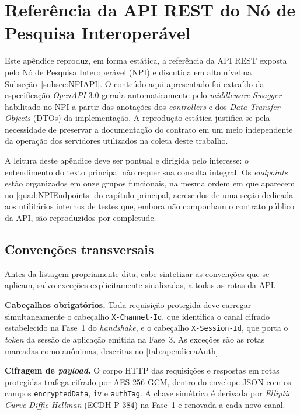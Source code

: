 \chapter{Referência da API REST do Nó de Pesquisa Interoperável}\label{cap:apendiceRefApi}

Este apêndice reproduz, em forma estática, a referência da API REST exposta pelo Nó de Pesquisa Interoperável (NPI) e discutida em alto nível na Subseção~\ref{subsec:NPIAPI}. O conteúdo aqui apresentado foi extraído da especificação \textit{OpenAPI} 3.0 gerada automaticamente pelo \textit{middleware} \textit{Swagger} habilitado no NPI a partir das anotações dos \textit{controllers} e dos \textit{Data Transfer Objects} (DTOs) da implementação. A reprodução estática justifica-se pela necessidade de preservar a documentação do contrato em um meio independente da operação dos servidores utilizados na coleta deste trabalho.

A leitura deste apêndice deve ser pontual e dirigida pelo interesse: o entendimento do texto principal não requer sua consulta integral. Os \textit{endpoints} estão organizados em onze grupos funcionais, na mesma ordem em que aparecem no \autoref{quad:NPIEndpoints} do capítulo principal, acrescidos de uma seção dedicada aos utilitários internos de testes que, embora não componham o contrato público da API, são reproduzidos por completude.

\section{Convenções transversais}\label{sec:apendiceaConvencoes}

Antes da listagem propriamente dita, cabe sintetizar as convenções que se aplicam, salvo exceções explicitamente sinalizadas, a todas as rotas da API.

\textbf{Cabeçalhos obrigatórios.} Toda requisição protegida deve carregar simultaneamente o cabeçalho \texttt{X-Channel-Id}, que identifica o canal cifrado estabelecido na Fase~1 do \textit{handshake}, e o cabeçalho \texttt{X-Session-Id}, que porta o \textit{token} da sessão de aplicação emitida na Fase~3. As exceções são as rotas marcadas como anônimas, descritas no \autoref{tab:apendiceaAuth}.

\textbf{Cifragem de \textit{payload}.} O corpo HTTP das requisições e respostas em rotas protegidas trafega cifrado por AES-256-GCM, dentro do envelope JSON com os campos \texttt{encryptedData}, \texttt{iv} e \texttt{authTag}. A chave simétrica é derivada por \textit{Elliptic Curve Diffie-Hellman} (ECDH P-384) na Fase~1 e renovada a cada novo canal.


